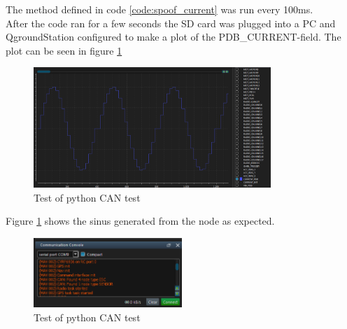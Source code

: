 The method defined in code \ref{code:spoof_current} was run every 100ms.\\
After the code ran for a few seconds the SD card was plugged into a PC and QgroundStation configured to make a plot of the PDB\_CURRENT-field. The plot can be seen in figure \ref{fig:pdb_current_log} 


\begin{figure}[H]
    \center
    \includegraphics[width=0.8\textwidth]{graphics/test_can_spoof_current.png}
    \caption{Test of python CAN test}
    \label{fig:pdb_current_log}
\end{figure}

Figure \ref{fig:pdb_current_log} shows the sinus generated from the node as expected.

\newpage
\begin{figure}[H]
    \center
    \includegraphics[width=0.5\textwidth]{graphics/test_register_node.png}
    \caption{Test of python CAN test}
    \label{fig:PCB_block}
\end{figure}